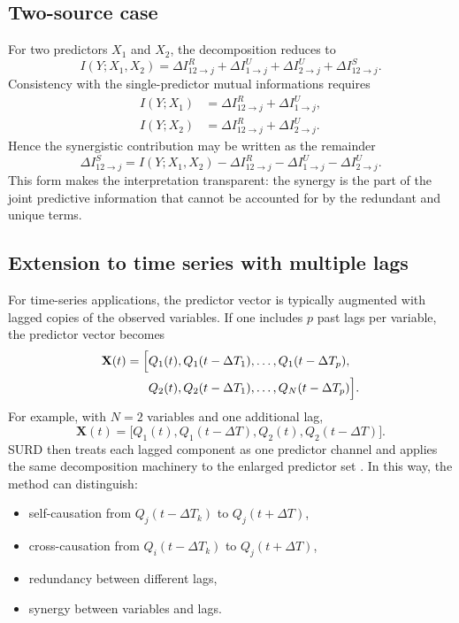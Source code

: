 \documentclass[fleqn,usenatbib]{mnras}
\begin{document}
\subsection{Two-source case}

For two predictors \(X_1\) and \(X_2\), the decomposition reduces to
\begin{equation}
I(Y;X_1,X_2)
=
\Delta I_{12\to j}^{R}
+
\Delta I_{1\to j}^{U}
+
\Delta I_{2\to j}^{U}
+
\Delta I_{12\to j}^{S}.
\label{eq:two_source_total}
\end{equation}
Consistency with the single-predictor mutual informations requires
\begin{align}
I(Y;X_1) &= \Delta I_{12\to j}^{R} + \Delta I_{1\to j}^{U},\\
I(Y;X_2) &= \Delta I_{12\to j}^{R} + \Delta I_{2\to j}^{U}.
\end{align}
Hence the synergistic contribution may be written as the remainder
\begin{equation}
\Delta I_{12\to j}^{S}
=
I(Y;X_1,X_2)
-
\Delta I_{12\to j}^{R}
-
\Delta I_{1\to j}^{U}
-
\Delta I_{2\to j}^{U}.
\end{equation}
This form makes the interpretation transparent: the synergy is the part of the joint predictive information that cannot be accounted for by the redundant and unique terms.

\subsection{Extension to time series with multiple lags}

For time-series applications, the predictor vector is typically augmented with lagged copies of the observed variables. If one includes \(p\) past lags per variable, the predictor vector becomes
\begin{equation}
\begin{split}
\mathbf{X}(t) = \Bigl[ & Q_1(t), Q_1(t-\Delta T_1), \ldots, Q_1(t-\Delta T_p), \\
                       & Q_2(t), Q_2(t-\Delta T_1), \ldots, Q_N(t-\Delta T_p) \Bigr].
\end{split}
\label{eq:lagged_vector_general}
\end{equation}
For example, with \(N=2\) variables and one additional lag,
\begin{equation}
\mathbf{X}(t)=
\bigl[
Q_1(t),Q_1(t-\Delta T),Q_2(t),Q_2(t-\Delta T)
\bigr].
\label{eq:lagged_vector_two}
\end{equation}
SURD then treats each lagged component as one predictor channel and applies the same decomposition machinery to the enlarged predictor set \cite{MartinezSanchez2024SURD}. In this way, the method can distinguish:
\begin{itemize}
    \item self-causation from \(Q_j(t-\Delta T_k)\) to \(Q_j(t+\Delta T)\),
    \item cross-causation from \(Q_i(t-\Delta T_k)\) to \(Q_j(t+\Delta T)\),
    \item redundancy between different lags,
    \item synergy between variables and lags.
\end{itemize}
\end{document}
